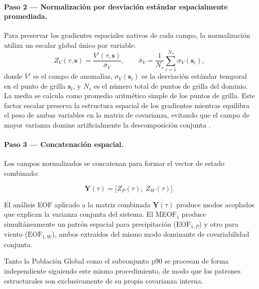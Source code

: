 \paragraph{Paso 2 — Normalización por desviación estándar espacialmente promediada.} Para preservar los gradientes espaciales nativos de cada campo, la normalización utiliza un escalar global único por variable:
\begin{equation}
    Z_{V}(\tau, \mathbf{s}) =
        \frac{V'(\tau, \mathbf{s})}{\bar{\sigma}_{V}},
    \qquad
    \bar{\sigma}_{V} = \frac{1}{N_s} \sum_{i=1}^{N_s} \sigma_{V}(\mathbf{s}_i),
\end{equation}
donde $V'$ es el campo de anomalías, $\sigma_{V}(\mathbf{s}_i)$ es la desviación estándar temporal en el punto de grilla $\mathbf{s}_i$, y $N_s$ es el número total de puntos de grilla del dominio. La media se calcula como promedio aritmético simple de los puntos de grilla.
Este factor escalar preserva la estructura espacial de los gradientes mientras equilibra el peso de ambas variables en la matriz de covarianza, evitando que el campo de mayor varianza domine artificialmente la descomposición conjunta \citep{wilks2019statistical_ch13}.

\paragraph{Paso 3 — Concatenación espacial.} Los campos normalizados se concatenan para formar el vector de estado combinado:

\begin{equation}\label{eq:meof_vector}
    \mathbf{Y}(\tau) = \big[ Z_P(\tau),\; Z_W(\tau) \big].
\end{equation}

El análisis EOF aplicado a la matriz combinada $\mathbf{Y}(\tau)$ produce modos acoplados que explican la varianza conjunta del sistema. El MEOF$_1$ produce simultáneamente un patrón espacial para precipitación ($\text{EOF}_{1,P}$) y otro para viento ($\text{EOF}_{1,W}$), ambos extraídos del mismo modo dominante de covariabilidad conjunta.

Tanto la Población Global como el subconjunto p90 se procesan de forma independiente siguiendo este mismo procedimiento, de modo que los patrones estructurales son exclusivamente de su propia covarianza interna.

